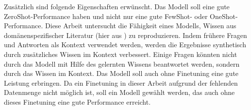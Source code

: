 Zusätzlich sind folgende Eigenschaften erwünscht.
Das Modell soll eine gute ZeroShot-Performance haben und nicht nur eine gute FewShot- oder OneShot-Performance.
Diese Arbeit untersucht die Fähigkeit eines Modells, Wissen aus domänenspezifischer Literatur (hier aus \citet{bb}) zu reproduzieren.
Indem frühere Fragen und Antworten als Kontext verwendet werden, werden die Ergebnisse synthetisch durch zusätzliches Wissen im Kontext verbessert.
Einige Fragen könnten nicht durch das Modell mit Hilfe des gelernten Wissens beantwortet werden, sondern durch das Wissen im Kontext.
Das Modell soll auch ohne Finetuning eine gute Leistung erbringen.
Da ein Finetuning in dieser Arbeit aufgrund der fehlenden Datenmenge nicht möglich ist, soll ein Modell gewählt werden, das auch ohne dieses Finetuning eine gute Performance erreicht.\\

